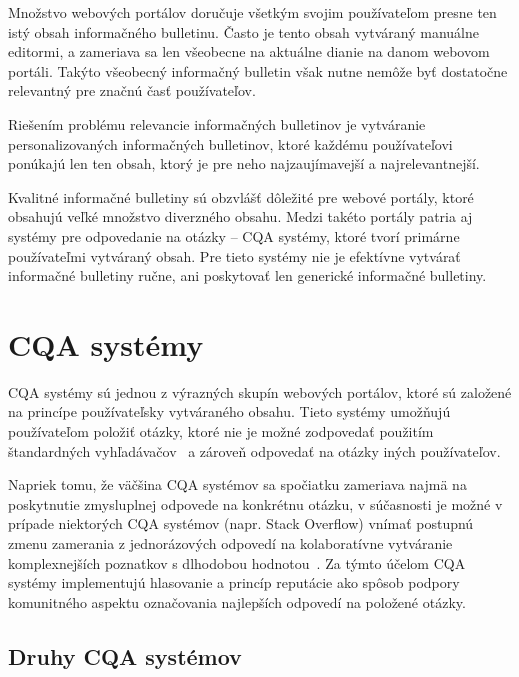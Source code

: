 Množstvo webových portálov doručuje všetkým svojim používateľom presne ten istý obsah informačného bulletinu.
Často je tento obsah vytváraný manuálne editormi, a zameriava sa len všeobecne na aktuálne dianie na danom webovom
portáli. Takýto všeobecný informačný bulletin však nutne nemôže byť dostatočne relevantný pre značnú časť používateľov.

Riešením problému relevancie informačných bulletinov je vytváranie personalizovaných informačných bulletinov, ktoré
každému používateľovi ponúkajú len ten obsah, ktorý je pre neho najzaujímavejší a najrelevantnejší.

Kvalitné informačné bulletiny sú obzvlášť dôležité pre webové portály, ktoré obsahujú veľké množstvo diverzného obsahu.
Medzi takéto portály patria aj systémy pre odpovedanie na otázky -- CQA systémy, ktoré tvorí primárne používateľmi
vytváraný obsah. Pre tieto systémy nie je efektívne vytvárať informačné bulletiny ručne, ani poskytovať len generické
informačné bulletiny.



\afterpage{\blankpage}
\newpage
\chapter{CQA systémy}

CQA systémy sú jednou z výrazných skupín webových portálov, ktoré sú založené na princípe používateľsky vytváraného obsahu.
Tieto systémy umožňujú používateľom položiť otázky, ktoré nie je možné zodpovedať použitím štandardných vyhľadávačov~\cite{Liu2012}
a zároveň odpovedať na otázky iných používateľov.

Napriek tomu, že väčšina CQA systémov sa spočiatku zameriava najmä na poskytnutie zmysluplnej odpovede na konkrétnu otázku,
v súčasnosti je možné v prípade niektorých CQA systémov (napr. Stack Overflow) vnímať postupnú zmenu zamerania
z jednorázových odpovedí na kolaboratívne vytváranie komplexnejších poznatkov s dlhodobou hodnotou~\cite{Anderson2012}.
Za týmto účelom CQA systémy implementujú hlasovanie a princíp reputácie ako spôsob podpory komunitného aspektu označovania
najlepších odpovedí na položené otázky.


\section{Druhy CQA systémov}

